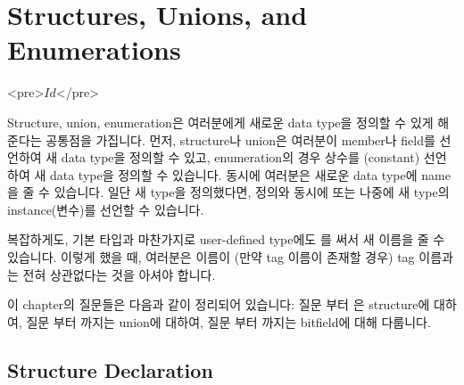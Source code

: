 \chapter{Structures, Unions, and Enumerations}	\label{chap:struct}

\begin{rawhtml}
<pre>$Id$</pre>
\end{rawhtml}

Structure, union, enumeration은 여러분에게 새로운 data type을 정의할 수
있게 해준다는 공통점을 가집니다.  먼저, structure나 union은 여러분이
member나 field를 선언하여 새 data type을 정의할 수 있고, enumeration의 경우
상수를 (constant) 선언하여 새 data type을 정의할 수 있습니다.
동시에 여러분은 새로운 data type에  name을 줄 수 있습니다.
일단 새 type을 정의했다면, 정의와 동시에 또는 나중에 새 type의 
instance(변수)를 선언할 수 있습니다.

복잡하게도, 기본 타입과 마찬가지로 user-defined type에도 를
써서 새 이름을 줄 수 있습니다. 이렇게 했을 때, 여러분은  이름이
(만약 tag 이름이 존재할 경우) tag 이름과는 전혀 상관없다는 것을 아셔야 
합니다.

이 chapter의 질문들은 다음과 같이 정리되어 있습니다:  
질문 부터 은
structure에 대하여, 질문 부터 까지는 union에 대하여,
질문 부터 까지는 bitfield에 대해 다룹니다.

\section{Structure Declaration}

